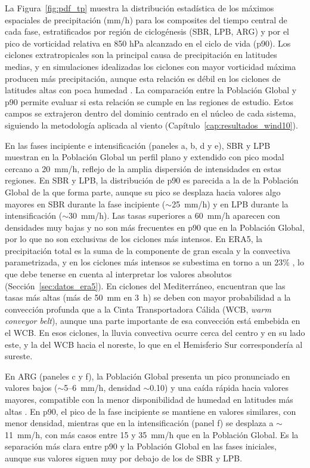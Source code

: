 La Figura~\ref{fig:pdf_tp} muestra la distribución estadística de los máximos espaciales de precipitación (mm/h) para los composites del tiempo central de cada fase, estratificados por región de ciclogénesis (SBR, LPB, ARG) y por el pico de vorticidad relativa en 850 hPa alcanzado en el ciclo de vida (p90).
Los ciclones extratropicales son la principal causa de precipitación en latitudes medias, y en simulaciones idealizadas los ciclones con mayor vorticidad máxima producen más precipitación, aunque esta relación es débil en los ciclones de latitudes altas con poca humedad \citep{sinclair2023relationship}. La comparación entre la Población Global y p90 permite evaluar si esta relación se cumple en las regiones de estudio.
Estos campos se extrajeron dentro del dominio centrado en el núcleo de cada sistema, siguiendo la metodología aplicada al viento (Capítulo~\ref{cap:resultados_wind10}).

En las fases incipiente e intensificación (paneles a, b, d y e), SBR y LPB muestran en la Población Global un perfil plano y extendido con pico modal cercano a 20~mm/h, reflejo de la amplia dispersión de intensidades en estas regiones.
En SBR y LPB, la distribución de p90 es parecida a la de la Población Global de la que forma parte, aunque su pico se desplaza hacia valores algo mayores en SBR durante la fase incipiente (${\sim}$25~mm/h) y en LPB durante la intensificación (${\sim}$30~mm/h). Las tasas superiores a 60~mm/h aparecen con densidades muy bajas y no son más frecuentes en p90 que en la Población Global, por lo que no son exclusivas de los ciclones más intensos.
En ERA5, la precipitación total es la suma de la componente de gran escala y la convectiva parametrizada, y en los ciclones más intensos se subestima en torno a un 23\% \citep{chen2024evaluation}, lo que debe tenerse en cuenta al interpretar los valores absolutos (Sección~\ref{sec:datos_era5}). En ciclones del Mediterráneo, \citet{flaounas2018heavy} encuentran que las tasas más altas (más de 50~mm en 3~h) se deben con mayor probabilidad a la convección profunda que a la Cinta Transportadora Cálida (WCB, \textit{warm conveyor belt}), aunque una parte importante de esa convección está embebida en el WCB. En esos ciclones, la lluvia convectiva ocurre cerca del centro y en su lado este, y la del WCB hacia el noreste, lo que en el Hemisferio Sur correspondería al sureste.

En ARG (paneles c y f), la Población Global presenta un pico pronunciado en valores bajos (${\sim}$5--6~mm/h, densidad ${\sim}$0.10) y una caída rápida hacia valores mayores, compatible con la menor disponibilidad de humedad en latitudes más altas \citep{sinclair2023relationship}.
En p90, el pico de la fase incipiente se mantiene en valores similares, con menor densidad, mientras que en la intensificación (panel f) se desplaza a ${\sim}$11~mm/h, con más casos entre 15 y 35~mm/h que en la Población Global. Es la separación más clara entre p90 y la Población Global en las fases iniciales, aunque sus valores siguen muy por debajo de los de SBR y LPB.

